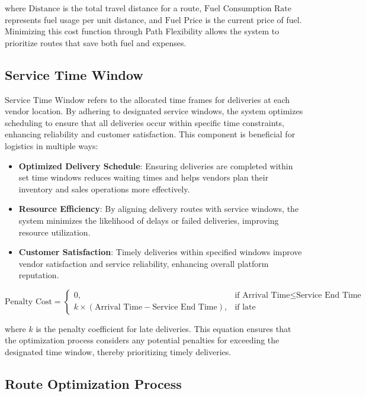 where \( \text{Distance} \) is the total travel distance for a route, \( \text{Fuel Consumption Rate} \) represents fuel usage per unit distance, and \( \text{Fuel Price} \) is the current price of fuel. Minimizing this cost function through Path Flexibility allows the system to prioritize routes that save both fuel and expenses.

\subsection{Service Time Window}

Service Time Window refers to the allocated time frames for deliveries at each vendor location. By adhering to designated service windows, the system optimizes scheduling to ensure that all deliveries occur within specific time constraints, enhancing reliability and customer satisfaction. This component is beneficial for logistics in multiple ways:

\begin{itemize}
    \item \textbf{Optimized Delivery Schedule}: Ensuring deliveries are completed within set time windows reduces waiting times and helps vendors plan their inventory and sales operations more effectively.
    \item \textbf{Resource Efficiency}: By aligning delivery routes with service windows, the system minimizes the likelihood of delays or failed deliveries, improving resource utilization.
    \item \textbf{Customer Satisfaction}: Timely deliveries within specified windows improve vendor satisfaction and service reliability, enhancing overall platform reputation.
\end{itemize}

\begin{equation}
    \text{Penalty Cost} = \begin{cases} 
      0, & \text{if } \text{Arrival Time} \leq \text{Service End Time} \\
      k \times (\text{Arrival Time} - \text{Service End Time}), & \text{if late}
   \end{cases}
\end{equation}

where \( k \) is the penalty coefficient for late deliveries. This equation ensures that the optimization process considers any potential penalties for exceeding the designated time window, thereby prioritizing timely deliveries.

\subsection{Route Optimization Process}

